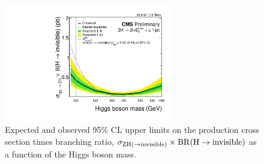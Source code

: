 %
%

 \begin{figure}[hbtp]
   \begin{center}
 \includegraphics[width=0.65\textwidth]{figures/ana_hzinv_met_nj_from110to1000_logx1_logy0.pdf}
     \caption{Expected and observed 95\% CL upper
        limits on the production cross section times branching ratio, 
 $\sigma_{\mathrm{Z}\mathrm{H}(\to \rm invisible)} \times \mathrm{BR}(\mathrm{H} \to {\rm invisible})$ as a function 
        of the Higgs boson mass.}
     \label{fig:xsLim}
   \end{center}
 \end{figure}

